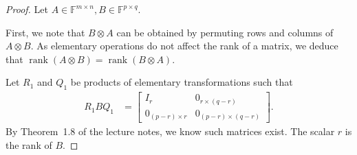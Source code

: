 \documentclass[11pt]{article}
\DeclareMathOperator{\rank}{rank}
\newcommand{\field}{\mathbb{F}} %
\newcommand{\kp}{\otimes} %
\begin{document}
\begin{proof}
Let \(A \in \field^{m\times n}, B \in \field^{p\times q}\).

First, we note that $B\kp A$ can be obtained by permuting rows and columns of $A\kp B$.
As elementary operations do not affect the rank of a matrix, we deduce that $\rank(A\kp B) = \rank(B\kp A)$.

Let $R_1$ and $Q_1$ be products of elementary transformations such that
\begin{align*}
    R_1BQ_1 &=\begin{bmatrix}
    I_r & 0_{r\times(q-r)}\\
    0_{(p-r)\times r} & 0_{(p-r)\times (q-r)}
    \end{bmatrix}.
\end{align*}
By Theorem~1.8 of the lecture notes, we know such matrices exist.
The scalar $r$ is the rank of \(B\).


\end{proof}
\end{document}
